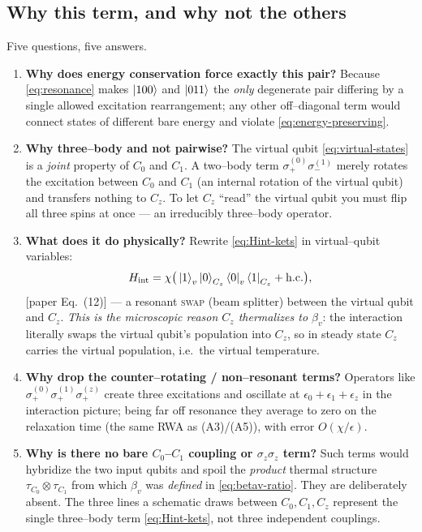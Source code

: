 \documentclass[11pt,a4paper]{article}
\theoremstyle{definition}
\theoremstyle{remark}
\begin{document}
\subsection{Why this term, and why not the others}
Five questions, five answers.
\begin{enumerate}[label=(\roman*),leftmargin=*]
\item \textbf{Why does energy conservation force exactly this pair?}
Because \eqref{eq:resonance} makes $\ket{100}$ and $\ket{011}$ the
\emph{only} degenerate pair differing by a single allowed excitation
rearrangement; any other off--diagonal term would connect states of
different bare energy and violate \eqref{eq:energy-preserving}.
\item \textbf{Why three--body and not pairwise?} The virtual qubit
\eqref{eq:virtual-states} is a \emph{joint} property of $C_0$ and $C_1$.
A two--body term $\sigma_+^{(0)}\sigma_-^{(1)}$ merely rotates the
excitation between $C_0$ and $C_1$ (an internal rotation of the virtual
qubit) and transfers nothing to $C_z$. To let $C_z$ ``read'' the virtual
qubit you must flip all three spins at once --- an irreducibly
three--body operator.
\item \textbf{What does it do physically?} Rewrite
\eqref{eq:Hint-kets} in virtual--qubit variables:
\begin{equation}
H_{\mathrm{int}} = \chi\big(\ket{1}_v\ket{0}_{C_z}
\bra{0}_v\bra{1}_{C_z} + \mathrm{h.c.}\big),
\label{eq:Hint-swap}
\end{equation}
[paper Eq.~(12)] --- a resonant \textsc{swap} (beam splitter) between the
virtual qubit and $C_z$. \emph{This is the microscopic reason $C_z$
thermalizes to $\beta_v$}: the interaction literally swaps the virtual
qubit's population into $C_z$, so in steady state $C_z$ carries the
virtual population, i.e.\ the virtual temperature.
\item \textbf{Why drop the counter--rotating / non--resonant terms?}
Operators like $\sigma_+^{(0)}\sigma_+^{(1)}\sigma_+^{(z)}$ create three
excitations and oscillate at $\epsilon_0+\epsilon_1+\epsilon_z$ in the
interaction picture; being far off resonance they average to zero on the
relaxation time (the same RWA as (A3)/(A5)), with error $O(\chi/\epsilon)$.
\item \textbf{Why is there no bare $C_0$--$C_1$ coupling or
$\sigma_z\sigma_z$ term?} Such terms would hybridize the two input
qubits and spoil the \emph{product} thermal structure
$\tau_{C_0}\otimes\tau_{C_1}$ from which $\beta_v$ was \emph{defined} in
\eqref{eq:betav-ratio}. They are deliberately absent. The three lines a
schematic draws between $C_0,C_1,C_z$ represent the single three--body
term \eqref{eq:Hint-kets}, not three independent couplings.
\end{enumerate}
\end{document}
